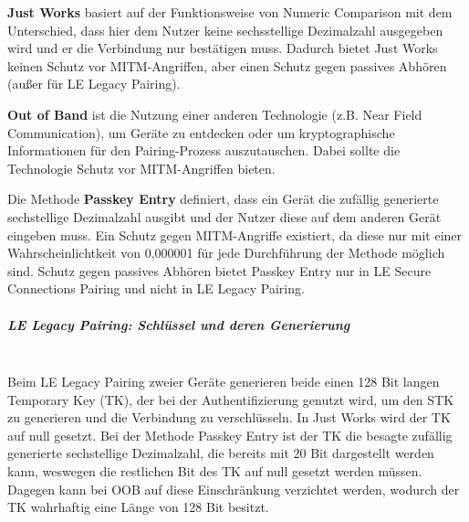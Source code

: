 \textbf{Just Works} basiert auf der Funktionsweise von Numeric Comparison mit dem Unterschied, dass hier dem Nutzer keine sechsstellige Dezimalzahl ausgegeben wird und er die Verbindung nur bestätigen muss. Dadurch bietet Just Works keinen Schutz vor MITM-Angriffen, aber einen Schutz gegen passives Abhören (außer für LE Legacy Pairing).

\textbf{Out of Band} ist die Nutzung einer anderen Technologie (z.B. Near Field Communication), um Geräte zu entdecken oder um kryptographische Informationen für den Pairing-Prozess auszutauschen. Dabei sollte die Technologie Schutz vor MITM-Angriffen bieten.

Die Methode \textbf{Passkey Entry} definiert, dass ein Gerät die zufällig generierte sechstellige Dezimalzahl ausgibt und der Nutzer diese auf dem anderen Gerät eingeben muss. 
Ein Schutz gegen MITM-Angriffe existiert, da diese nur mit einer Wahrscheinlichtkeit von 0,000001 für jede Durchführung der Methode möglich sind. Schutz gegen passives Abhören bietet Passkey Entry nur in LE Secure Connections Pairing und nicht in LE Legacy Pairing.



\subparagraph{LE Legacy Pairing: Schlüssel und deren Generierung} \mbox{} \vspace{0.2cm} \\

Beim LE Legacy Pairing zweier Geräte generieren beide einen 128 Bit langen Temporary Key (TK), der bei der Authentifizierung genutzt wird, um den STK zu generieren und die Verbindung zu verschlüsseln. In Just Works wird der TK auf null gesetzt. Bei der Methode Passkey Entry ist der TK die besagte zufällig generierte sechstellige Dezimalzahl, die bereits mit 20 Bit dargestellt werden kann, weswegen die restlichen Bit des TK auf null gesetzt werden müssen. Dagegen kann bei OOB auf diese Einschränkung verzichtet werden, wodurch der TK wahrhaftig eine Länge von 128 Bit besitzt.

